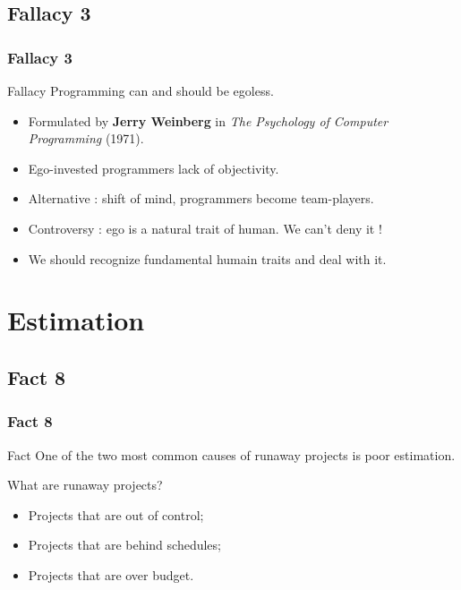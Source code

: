 \documentclass{beamer}
\begin{document}
\subsection{Fallacy 3}
\begin{frame}
    \frametitle{Fallacy 3}
    \begin{block}{Fallacy}
    Programming can and should be egoless.
    \end{block}
    \begin{itemize}
     \pause
     \item Formulated by \textbf{Jerry Weinberg} in \textit{The Psychology of Computer Programming} (1971).
     \pause
     \item Ego-invested programmers lack of objectivity.
     \pause
     \item Alternative : shift of mind, programmers become team-players.
     \pause
     \item Controversy : ego is a natural trait of human. We can't deny it !
     \pause
     \item We should recognize fundamental humain traits and deal with it.
    \end{itemize}

\end{frame}

\section{Estimation}

\subsection{Fact 8}
\begin{frame}
    \frametitle{Fact 8}
    \begin{block}{Fact}
    One of the two most common causes of runaway projects is poor estimation.
    \end{block}
    \pause

    What are runaway projects?
    \begin{itemize}
        \item Projects that are out of control;
        \pause
        \item Projects that are behind schedules;
        \pause
        \item Projects that are over budget.
    \end{itemize}
\end{frame}
\end{document}
